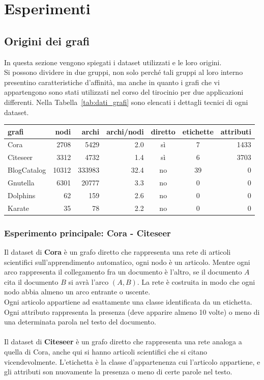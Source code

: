 %
%
\chapter{Esperimenti}
\section{Origini dei grafi}
In questa sezione vengono spiegati i dataset utilizzati e le loro origini.\\
Si possono dividere in due gruppi, non solo perché tali gruppi al loro interno presentino caratteristiche d'affinità, ma anche in quanto i grafi che vi appartengono sono stati utilizzati nel corso del tirocinio per due applicazioni differenti. Nella Tabella~\ref{tab:dati_grafi} sono elencati i dettagli tecnici di ogni dataset.
%
\begin{center}
	\begin{tabular}{|l|r|r|r|c|c|r|}
		\hline
		grafi&nodi&archi&archi/nodi&diretto&etichette&attributi\\
		\hline
		Cora & 2708 & 5429 & 2.0 & sì & 7 & 1433\\
		Citeseer & 3312 & 4732 & 1.4 & sì & 6 & 3703\\
		\hline
		BlogCatalog & 10312 & 333983 & 32.4 & no & 39 & 0\\
		Gnutella & 6301 & 20777 & 3.3 & no & 0 & 0\\
		Dolphins & 62 & 159 & 2.6 & no & 0 & 0\\
		Karate & 35 & 78 & 2.2 & no & 0 & 0\\
		\hline
		\end{tabular}
		\label{tab:dati_grafi}
\end{center}
%
\subsection*{Esperimento principale: Cora - Citeseer}\cite{Co-Ci_1}\cite{Co-Ci_2}
Il dataset di \textbf{Cora} è un grafo diretto che rappresenta una rete di articoli scientifici sull'apprendimento automatico, ogni nodo è un articolo. Mentre ogni arco rappresenta il collegamento fra un documento è l'altro, se il documento $A$ cita il documento $B$ si avrà l'arco $(A, B)$. La rete è costruita in modo che ogni nodo abbia almeno un arco entrante o uscente.\\
Ogni articolo appartiene ad esattamente una classe identificata da un etichetta. Ogni attributo rappresenta la presenza (deve apparire almeno 10 volte) o meno di una determinata parola nel testo del documento.\\
\\
Il dataset di \textbf{Citeseer} è un grafo diretto che rappresenta una rete analoga a quella di Cora, anche qui si hanno articoli scientifici che si citano vicendevolmente. L'etichetta è la classe d'appartenenza cui l'articolo appartiene, e gli attributi son nuovamente la presenza o meno di certe parole nel testo.\\
%

